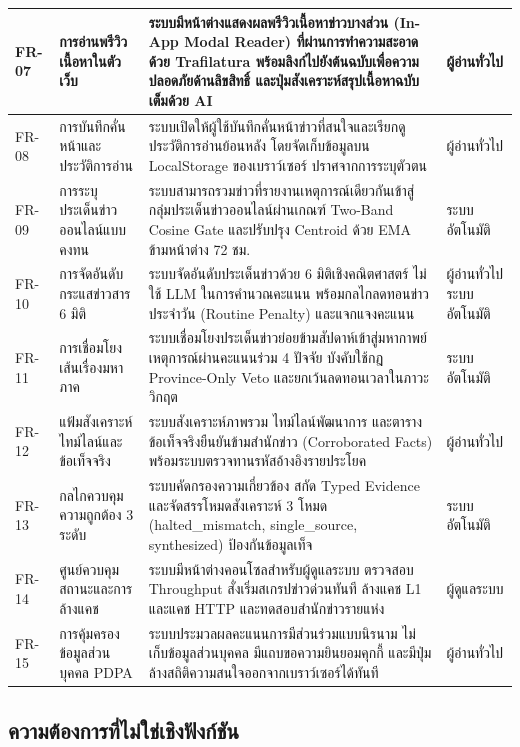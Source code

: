 \begin{longtable}{|C{1.3cm}|L{3.6cm}|L{6.0cm}|L{1.8cm}|}
FR-07 & การอ่านพรีวิวเนื้อหาในตัวเว็บ & ระบบมีหน้าต่างแสดงผลพรีวิวเนื้อหาข่าวบางส่วน (In-App Modal Reader) ที่ผ่านการทำความสะอาดด้วย Trafilatura พร้อมลิงก์ไปยังต้นฉบับเพื่อความปลอดภัยด้านลิขสิทธิ์ และปุ่มสังเคราะห์สรุปเนื้อหาฉบับเต็มด้วย AI & ผู้อ่านทั่วไป \\ \hline
FR-08 & การบันทึกคั่นหน้าและประวัติการอ่าน & ระบบเปิดให้ผู้ใช้บันทึกคั่นหน้าข่าวที่สนใจและเรียกดูประวัติการอ่านย้อนหลัง โดยจัดเก็บข้อมูลบน LocalStorage ของเบราว์เซอร์ ปราศจากการระบุตัวตน & ผู้อ่านทั่วไป \\ \hline
FR-09 & การระบุประเด็นข่าวออนไลน์แบบคงทน & ระบบสามารถรวมข่าวที่รายงานเหตุการณ์เดียวกันเข้าสู่กลุ่มประเด็นข่าวออนไลน์ผ่านเกณฑ์ Two-Band Cosine Gate และปรับปรุง Centroid ด้วย EMA ข้ามหน้าต่าง 72 ชม. & ระบบอัตโนมัติ \\ \hline
FR-10 & การจัดอันดับกระแสข่าวสาร 6 มิติ & ระบบจัดอันดับประเด็นข่าวด้วย 6 มิติเชิงคณิตศาสตร์ ไม่ใช้ LLM ในการคำนวณคะแนน พร้อมกลไกลดทอนข่าวประจำวัน (Routine Penalty) และแจกแจงคะแนน & ผู้อ่านทั่วไป \newline ระบบอัตโนมัติ \\ \hline
FR-11 & การเชื่อมโยงเส้นเรื่องมหาภาค & ระบบเชื่อมโยงประเด็นข่าวย่อยข้ามสัปดาห์เข้าสู่มหากาพย์เหตุการณ์ผ่านคะแนนร่วม 4 ปัจจัย บังคับใช้กฎ Province-Only Veto และยกเว้นลดทอนเวลาในภาวะวิกฤต & ระบบอัตโนมัติ \\ \hline
FR-12 & แฟ้มสังเคราะห์ไทม์ไลน์และข้อเท็จจริง & ระบบสังเคราะห์ภาพรวม ไทม์ไลน์พัฒนาการ และตารางข้อเท็จจริงยืนยันข้ามสำนักข่าว (Corroborated Facts) พร้อมระบบตรวจทานรหัสอ้างอิงรายประโยค & ผู้อ่านทั่วไป \\ \hline
FR-13 & กลไกควบคุมความถูกต้อง 3 ระดับ & ระบบคัดกรองความเกี่ยวข้อง สกัด Typed Evidence และจัดสรรโหมดสังเคราะห์ 3 โหมด (halted\_mismatch, single\_source, synthesized) ป้องกันข้อมูลเท็จ & ระบบอัตโนมัติ \\ \hline
FR-14 & ศูนย์ควบคุมสถานะและการล้างแคช & ระบบมีหน้าต่างคอนโซลสำหรับผู้ดูแลระบบ ตรวจสอบ Throughput สั่งเริ่มสเกรปข่าวด่วนทันที ล้างแคช L1 และแคช HTTP และทดสอบสำนักข่าวรายแห่ง & ผู้ดูแลระบบ \\ \hline
FR-15 & การคุ้มครองข้อมูลส่วนบุคคล PDPA & ระบบประมวลผลคะแนนการมีส่วนร่วมแบบนิรนาม ไม่เก็บข้อมูลส่วนบุคคล มีแถบขอความยินยอมคุกกี้ และมีปุ่มล้างสถิติความสนใจออกจากเบราว์เซอร์ได้ทันที & ผู้อ่านทั่วไป \\
\hline
\end{longtable}
\renewcommand{\arraystretch}{1.0}

\subsection{ความต้องการที่ไม่ใช่เชิงฟังก์ชัน}

